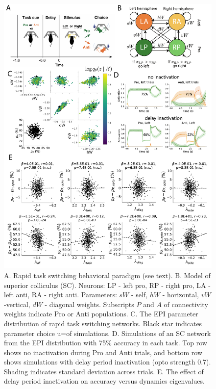 \documentclass[11pt]{article}
\begin{document}
\begin{figure}
\begin{center}
\includegraphics[scale=0.48]{figs/fig4.pdf}
\end{center}
\caption{\small 
A. Rapid task switching behavioral paradigm (see text). 
B. Model of superior colliculus (SC). Neurons: LP - left pro, RP - right pro, LA - left anti, RA - right anti. 
Parameters: $sW$ - self, $hW$ - horizontal, $vW$ -vertical, $dW$ - diagonal weights.  
Subscripts $P$ and $A$ of connectivity weights indicate Pro or Anti populations.
C. The EPI parameter distribution of rapid task switching networks.  Black star indicates parameter choice u=of simulations.
D. Simulations of an SC network from the EPI distribution with 75\% accuracy in each task.  Top row shows no inactivation during Pro and Anti trials, and bottom row shows simulations with delay period inactivation (opto strength 0.7).  Shading indicates standard deviation across trials.
E. The effect of delay period inactivation on accuracy versus dynamics eigenvalues.
}
\label{fig:SC}
\end{figure}
\end{document}
